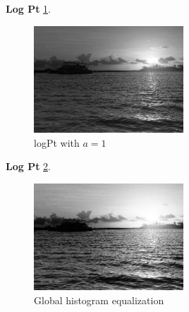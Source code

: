 \textbf{Log Pt} \cref{fig2g_t3}.
\begin{figure}
  \centering
  \includegraphics[width=0.5\textwidth]{image/tmp/7_result_3.jpg}
  \caption{logPt with $a=1$}
  \label{fig2g_t3}
\end{figure}

\textbf{Log Pt} \cref{fig2g_t6}.
\begin{figure}
  \centering
  \includegraphics[width=0.5\textwidth]{image/tmp/7_result_6.jpg}
  \caption{Global histogram equalization}
  \label{fig2g_t6}
\end{figure}
